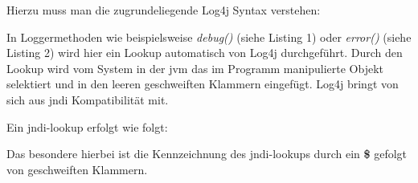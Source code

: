 Hierzu muss man die zugrundeliegende Log4j Syntax verstehen:

\bigskip

In Loggermethoden wie beispielsweise \textit{debug()} (siehe Listing 1) oder \textit{error()} (siehe Listing 2) wird hier ein Lookup automatisch von Log4j durchgeführt.
Durch den Lookup wird vom System in der \gls{jvm} das im Programm manipulierte Objekt selektiert und in den leeren geschweiften Klammern eingefügt.
Log4j bringt von sich aus \gls{jndi} Kompatibilität mit.

Ein \gls{jndi}-lookup erfolgt wie folgt:

\bigskip

Das besondere hierbei ist die Kennzeichnung des \gls{jndi}-lookups durch ein \textbf{\$} gefolgt von geschweiften Klammern.